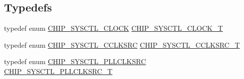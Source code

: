 \subsection*{Typedefs}
\begin{DoxyCompactItemize}
\item 
typedef enum \hyperlink{group___c_l_o_c_k__17_x_x__40_x_x_ga16115d41e6af3d543d4c5457d8d8343c}{C\+H\+I\+P\+\_\+\+S\+Y\+S\+C\+T\+L\+\_\+\+C\+L\+O\+C\+K} \hyperlink{group___c_l_o_c_k__17_x_x__40_x_x_ga82e75cbe777e79f448fec3987ddd978e}{C\+H\+I\+P\+\_\+\+S\+Y\+S\+C\+T\+L\+\_\+\+C\+L\+O\+C\+K\+\_\+\+T}
\item 
typedef enum \hyperlink{group___c_l_o_c_k__17_x_x__40_x_x_ga1eb1eeae65911ee3e97009ae1d31d03f}{C\+H\+I\+P\+\_\+\+S\+Y\+S\+C\+T\+L\+\_\+\+C\+C\+L\+K\+S\+R\+C} \hyperlink{group___c_l_o_c_k__17_x_x__40_x_x_ga983f42d70f3939d1f1b46673e9e1f838}{C\+H\+I\+P\+\_\+\+S\+Y\+S\+C\+T\+L\+\_\+\+C\+C\+L\+K\+S\+R\+C\+\_\+\+T}
\item 
typedef enum \hyperlink{group___c_l_o_c_k__17_x_x__40_x_x_gab8e9f23b5fc6f78e50dbe7310743573d}{C\+H\+I\+P\+\_\+\+S\+Y\+S\+C\+T\+L\+\_\+\+P\+L\+L\+C\+L\+K\+S\+R\+C} \hyperlink{group___c_l_o_c_k__17_x_x__40_x_x_gacda7fd6d13922330ce9344dbc4ec85b7}{C\+H\+I\+P\+\_\+\+S\+Y\+S\+C\+T\+L\+\_\+\+P\+L\+L\+C\+L\+K\+S\+R\+C\+\_\+\+T}
\end{DoxyCompactItemize}
